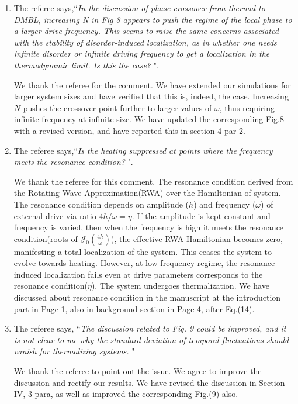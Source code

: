 \documentclass[aps,prb,reprint,showpacs,floatfix,superscriptaddress, onecolumn, nofootinbib, 9pt]{revtex4-2}
\newcommand{\response}[1]{{\color{blue}#1}} %
\begin{document}
\begin{enumerate}
		\item The referee says,``\textit{In the discussion of phase crossover from thermal to DMBL, increasing N in Fig 8 appears to push the regime of the local phase to a larger drive frequency. This seems to raise the same concerns associated with the stability of disorder-induced localization, as in whether one needs infinite disorder or infinite driving frequency to
			get a localization in the thermodynamic limit. Is this the case? }".
		
		\response{    	
			We thank the referee for the comment. We have extended our simulations for larger system sizes and have verified that this is, indeed, the case. Increasing $N$ pushes the crossover point further to larger values of $\omega$, thus requiring infinite frequency at infinite size. We have updated the corresponding Fig.8 with a revised version, and have reported this in section 4 par 2.
		}
		\item The referee says,``\textit{Is the heating suppressed at points where the frequency meets the resonance condition? }".
		
		\response{
			We thank the referee for this comment. The resonance condition derived from the Rotating Wave Approximation(RWA) over the Hamiltonian of system. The resonance condition depends on amplitude ($h$) and frequency ($\omega$) of external drive via ratio $4h/\omega=\eta$. If the amplitude is kept constant and frequency is varied, then when the frequency is high it meets the resonance condition(roots of  $\mathcal{J}_0\left(\frac{4h}{\omega}\right)$), the effective RWA Hamiltonian becomes zero, manifesting a total localization of the system. This ceases the system to evolve towards heating. However, at low-frequency regime, the resonance induced localization fails even at drive parameters corresponds to the resonance condition($\eta$). The system undergoes thermalization. We have discussed about resonance condition in the manuscript at the introduction part in Page 1, also in background section in Page 4, after Eq.(14). 
		}
		
		\item The referee says, ``\textit{The discussion related to Fig. 9 could be improved, and it is not clear to me why the standard deviation of temporal fluctuations should vanish for thermalizing systems. }"\\
		
		\response{ We thank the referee to point out the issue. We agree to improve the discussion and rectify our results. We have revised the discussion in Section IV, 3 para, as well as improved the corresponding Fig.(9) also.
			
}
\end{enumerate}
\end{document}
